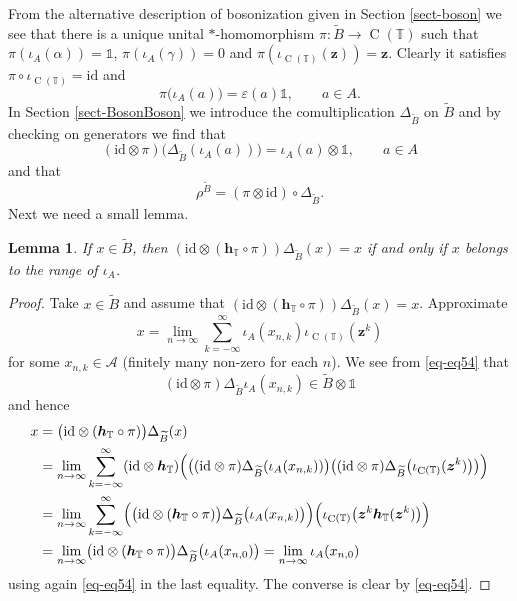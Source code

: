 \documentclass[12pt,reqno,a4paper]{amsart}
\newtheorem{lemma}[proposition]{Lemma}
\theoremstyle{definition}
\newcommand{\comp}{\circ}
\newcommand{\eps}{\varepsilon}
\newcommand{\I}{\mathds{1}}
\newcommand{\id}{\mathrm{id}}
\newcommand{\tens}{\otimes}
\newcommand{\TT}{\mathbb{T}}
\newcommand{\cA}{\mathscr{A}}
\newcommand{\bh}{{\boldsymbol{h}}}
\newcommand{\bz}{{\boldsymbol{z}}}
\DeclareMathOperator{\C}{C}
\numberwithin{equation}{section}
\begin{document}
From the alternative description of bosonization given in Section \ref{sect-boson} we see that there is a unique unital $*$-homomorphism $\pi\colon\widetilde{B}\to\C(\TT)$ such that $\pi(\iota_A(\alpha))=\I$, $\pi(\iota_A(\gamma))=0$ and $\pi(\iota_{\C(\TT)}(\bz))=\bz$. Clearly it satisfies $\pi\comp\iota_{\C(\TT)}=\id$ and
\[
\pi\bigl(\iota_A(a)\bigr)=\eps(a)\I,\qquad a\in A.
\]
In Section \ref{sect-BosonBoson} we introduce the comultiplication $\Delta_{\widetilde{B}}$ on $\widetilde{B}$ and by checking on generators we find that
\begin{equation}\label{eq-eq54}
(\id\tens\pi)\bigl(\Delta_{\widetilde{B}}(\iota_A(a))\bigr)=\iota_A(a)\tens\I,\qquad a\in A
\end{equation}
and that
\begin{equation}\label{eq-eq55}
\rho^{\widetilde{B}}=(\pi\tens\id)\comp\Delta_{\widetilde{B}}.
\end{equation}
Next we need a small lemma.

\begin{lemma}\label{lem-lemma20}
If $x\in\widetilde{B}$, then $(\id\tens(\bh_{\TT}\comp\pi))\Delta_{\widetilde{B}}(x)=x$ if and only if $x$ belongs to the range of $\iota_A$.
\end{lemma}

\begin{proof}
Take $x\in \widetilde{B}$ and assume that $(\id\tens(\bh_{\TT}\comp\pi))\Delta_{\widetilde{B}}(x)=x$. Approximate
\[
x=\lim_{n\to\infty}\sum_{k=-\infty}^{\infty}\iota_A(x_{n,k})\iota_{\C(\TT)}(\bz^k)
\]
for some $x_{n,k}\in\cA$ (finitely many non-zero for each $n$). We see from \eqref{eq-eq54} that
\[
(\id\tens\pi)\Delta_{\widetilde{B}}\iota_A(x_{n,k})\in\widetilde{B}\tens\I
\]
and hence
\begin{align*}
x&=\bigl(\id\tens(\bh_{\TT}\comp\pi)\bigr)\Delta_{\widetilde{B}}(x)\\
&=\lim_{n\to\infty}\sum_{k=-\infty}^{\infty}
(\id\tens\bh_{\TT})
\Bigl(
\bigl(
(\id\tens\pi)\Delta_{\widetilde{B}}(\iota_A(x_{n,k}))
\bigr)
\bigl(
(\id\tens\pi)\Delta_{\widetilde{B}}\bigl(\iota_{\C(\TT)}(\bz^k)\bigr)
\bigr)\Bigr)\\
&=\lim_{n\to\infty}\sum_{k=-\infty}^{\infty}
\Bigl(
\bigl(\id\tens(\bh_{\TT}\comp\pi)\bigr)
\Delta_{\widetilde{B}}\bigl(\iota_A(x_{n,k})\bigr)
\Bigr)
\Bigl(
\iota_{\C(\TT)}\bigl(\bz^k\bh_{\TT}(\bz^k)\bigr)
\Bigr)\\
&=\lim_{n\to\infty}
\bigl(\id\tens(\bh_{\TT}\comp\pi)\bigr)\Delta_{\widetilde{B}}\bigl(\iota_A(x_{n,0})\bigr)
=\lim_{n\to\infty}\iota_A(x_{n,0})
\end{align*}
using again \eqref{eq-eq54} in the last equality. The converse is clear by \eqref{eq-eq54}.
\end{proof}
\end{document}
